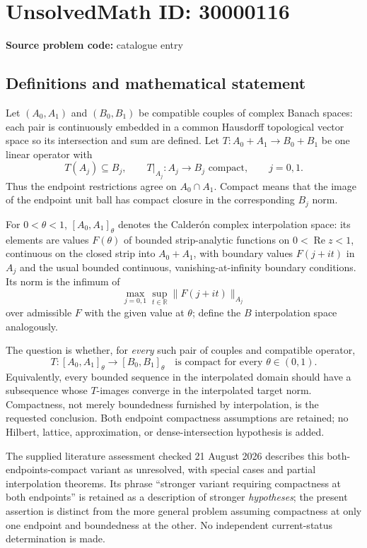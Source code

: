 \documentclass[11pt]{article}
\newcommand{\R}{\mathbb{R}}
\begin{document}
\section*{UnsolvedMath ID: 30000116}
\textbf{Source problem code:} catalogue entry
\subsection{Definitions and mathematical statement}
Let $(A_0,A_1)$ and $(B_0,B_1)$ be compatible couples of complex Banach spaces: each pair is continuously embedded in a common Hausdorff topological vector space so its intersection and sum are defined. Let $T:A_0+A_1\to B_0+B_1$ be one linear operator with
\[
 T(A_j)\subseteq B_j,\qquad T|_{A_j}:A_j\to B_j
 \text{ compact},\qquad j=0,1.
\]
Thus the endpoint restrictions agree on $A_0\cap A_1$. Compact means that the image of the endpoint unit ball has compact closure in the corresponding $B_j$ norm.

For $0<\theta<1$, $[A_0,A_1]_\theta$ denotes the Calder\'on complex interpolation space: its elements are values $F(\theta)$ of bounded strip-analytic functions on $0<\operatorname{Re}z<1$, continuous on the closed strip into $A_0+A_1$, with boundary values $F(j+it)$ in $A_j$ and the usual bounded continuous, vanishing-at-infinity boundary conditions. Its norm is the infimum of
\[
 \max_{j=0,1}\sup_{t\in\R}\|F(j+it)\|_{A_j}
\]
over admissible $F$ with the given value at $\theta$; define the $B$ interpolation space analogously.

The question is whether, for \emph{every} such pair of couples and compatible operator,
\[
 T:[A_0,A_1]_\theta\longrightarrow[B_0,B_1]_\theta
 \quad\text{is compact for every }\theta\in(0,1).
\]
Equivalently, every bounded sequence in the interpolated domain should have a subsequence whose $T$-images converge in the interpolated target norm. Compactness, not merely boundedness furnished by interpolation, is the requested conclusion. Both endpoint compactness assumptions are retained; no Hilbert, lattice, approximation, or dense-intersection hypothesis is added.

The supplied literature assessment checked 21 August 2026 describes this both-endpoints-compact variant as unresolved, with special cases and partial interpolation theorems. Its phrase ``stronger variant requiring compactness at both endpoints'' is retained as a description of stronger \emph{hypotheses}; the present assertion is distinct from the more general problem assuming compactness at only one endpoint and boundedness at the other. No independent current-status determination is made.
\end{document}
